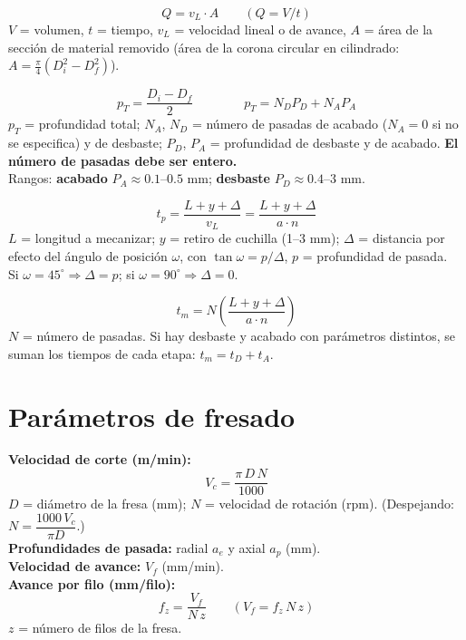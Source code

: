 \documentclass[12pt,a4paper]{article}
\begin{document}
\begin{formu}
	\[ Q = v_L \cdot A \qquad (Q = V/t) \]
	$V$ = volumen, $t$ = tiempo, $v_L$ = velocidad lineal o de avance, $A$ = área
	de la sección de material removido (área de la corona circular en cilindrado:
	$A
		= \tfrac{\pi}{4}(D_i^2 - D_f^2)$).
\end{formu}

\begin{formu}
	\[ p_T = \frac{D_i - D_f}{2} \qquad\qquad p_T = N_D P_D + N_A P_A \]
	$p_T$ = profundidad total; $N_A$, $N_D$ = número de pasadas de acabado ($N_A =
		0$ si no se especifica) y de
	desbaste; $P_D$, $P_A$ = profundidad de desbaste y de acabado. \textbf{El
		número
		de pasadas debe ser entero.}\\
	Rangos: \textbf{acabado} $P_A \approx 0.1$--$0.5$ mm;
	\textbf{desbaste} $P_D \approx 0.4$--$3$ mm.\\
\end{formu}

\begin{formu}
	\[ t_p = \frac{L + y + \Delta}{v_L} = \frac{L + y + \Delta}{a\cdot n} \]
	$L$ = longitud a mecanizar; $y$ = retiro de cuchilla (1--3 mm); $\Delta$ =
	distancia por efecto del ángulo de posición $\omega$, con $\tan\omega =
		p/\Delta$, $p$ = profundidad de pasada.\\
	Si $\omega = 45^\circ \Rightarrow \Delta = p$; si $\omega = 90^\circ
		\Rightarrow \Delta = 0$.
\end{formu}

\begin{formu}
	\[ t_m = N\left(\frac{L + y + \Delta}{a\cdot n}\right) \]
	$N$ = número de pasadas. Si hay desbaste y acabado con parámetros distintos,
	se suman los tiempos de cada etapa: $t_m = t_D + t_A$.
\end{formu}


\section{Parámetros de fresado}

\begin{formu}
	\textbf{Velocidad de corte (m/min):}
	\[ V_c = \frac{\pi\, D\, N}{1000} \]
	$D$ = diámetro de la fresa (mm); $N$ = velocidad de rotación (rpm).
	(Despejando:
	$N = \dfrac{1000\,V_c}{\pi D}$.)\\[4pt]
	\textbf{Profundidades de pasada:} radial $a_e$ y axial $a_p$ (mm).\\[4pt]
	\textbf{Velocidad de avance:} $V_f$ (mm/min).\\[4pt]
	\textbf{Avance por filo (mm/filo):}
	\[ f_z = \frac{V_f}{N\, z} \qquad\left(V_f = f_z\, N\, z\right) \]
	$z$ = número de filos de la fresa.
\end{formu}
\end{document}
